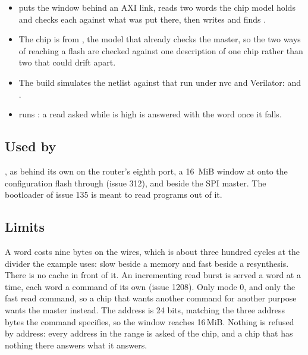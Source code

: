 \begin{itemize}
\item {} puts the window behind an AXI
link, reads two words the chip model holds and checks each against
what was put there, then writes and finds .
\item The chip is  from , the model that
already checks the master, so the two ways of reaching a flash are
checked against one description of one chip rather than two that could
drift apart.
\item The build simulates the netlist against that run under nvc and
Verilator:  and
.
\item {} runs
: a read asked
while  is high is answered with the word once it falls.
\end{itemize}

\subsection*{Used by}

, as  behind its own  on the
router's eighth port, a 16~MiB window at  onto the
configuration flash through  (issue 312), and
 beside the SPI master. The bootloader of issue 135
is meant to read programs out of it.

\subsection*{Limits}

A word costs nine bytes on the wires, which is about three hundred
cycles at the divider the example uses: slow beside a memory and fast
beside a resynthesis. There is no cache in front of it. An incrementing
read burst is served a word at a time, each word a command of its own
(issue 1208). Only mode 0, and only the fast read command, so a chip that
wants another command for another purpose wants the master instead.
The address is 24 bits, matching the three address bytes the command specifies, so the
window reaches 16\,MiB. Nothing is refused by address: every address
in the range is asked of the chip, and a chip that has nothing there
answers what it answers.
